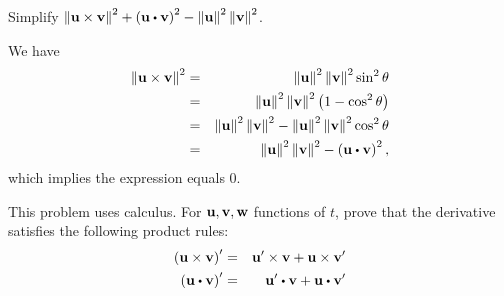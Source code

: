 \begin{enumialphparenastyle}
\begin{ex}
\begin{sol}
  \end{sol}
\end{ex}

\begin{ex}
  Simplify
  $\norm{\vect{u}\times \vect{v}} ^{2}+\tup{ \vect{u}\dotprod
    \vect{v}} ^{2}-\norm{\vect{u}} ^{2}\norm{ \vect{v}} ^{2}$.
  \begin{sol}
    We have
    \begin{eqnarray*}
      \norm{\vect{u}\times \vect{v}} ^{2}
      &=&\norm{\vect{u}
          } ^{2}\norm{\vect{v}} ^{2}\sin ^{2}\theta \\
      &=&\norm{\vect{u}} ^{2}\norm{\vect{v}}
          ^{2}\tup{1-\cos ^{2}\theta } \\
      &=&\norm{\vect{u}} ^{2}\norm{\vect{v}}
          ^{2}-\norm{\vect{u}} ^{2}\norm{\vect{v}}
          ^{2}\cos ^{2}\theta \\
      &=&\norm{\vect{u}} ^{2}\norm{\vect{v}}
          ^{2}-\tup{\vect{u}\dotprod \vect{v}} ^{2},
    \end{eqnarray*}
    which implies the expression equals $0$.
  \end{sol}
\end{ex}

\begin{ex}
  This problem uses calculus. For $\mbox{\bf u},\mbox{\bf v},\mbox{\bf w}$
  functions of $t$, prove that the derivative satisfies the following
  product rules:
  \begin{eqnarray*}
    \tup{\vect{u}\times \vect{v}} ^{\prime }
    &=&\vect{u}^{\prime }\times
        \vect{v}+\vect{u}\times \vect{v}^{\prime } \\
    \tup{\vect{u}\dotprod \vect{v}} ^{\prime }
    &=&\vect{u}^{\prime }\dotprod
        \vect{v}+\vect{u}\dotprod \vect{v}^{\prime }
  \end{eqnarray*}
\end{ex}

\end{enumialphparenastyle}
